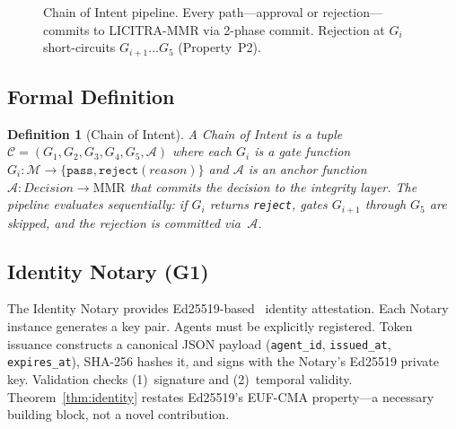 \documentclass[11pt,a4paper]{article}
\newtheorem{definition}[theorem]{Definition}
\begin{document}
\begin{figure}[ht]
\caption{Chain of Intent pipeline. Every path---approval or rejection---commits to
LICITRA-MMR via 2-phase commit. Rejection at $G_i$ short-circuits $G_{i+1}\ldots G_5$
(Property~P2).}
\label{fig:pipeline}
\end{figure}

\subsection{Formal Definition}

\begin{definition}[Chain of Intent]\label{def:chain}
A Chain of Intent is a tuple $\mathcal{C} = (G_1, G_2, G_3, G_4, G_5, \mathcal{A})$ where each
$G_i$ is a gate function $G_i: \mathcal{M} \to \{\texttt{pass}, \texttt{reject}(reason)\}$ and
$\mathcal{A}$ is an anchor function $\mathcal{A}: Decision \to \mathrm{MMR}$ that commits the
decision to the integrity layer. The pipeline evaluates sequentially: if $G_i$ returns
\texttt{reject}, gates $G_{i+1}$ through $G_5$ are skipped, and the rejection is committed
via~$\mathcal{A}$.
\end{definition}

\subsection{Identity Notary (G1)}

The Identity Notary provides Ed25519-based~\cite{ed25519} identity attestation. Each Notary
instance generates a key pair. Agents must be explicitly registered. Token issuance constructs a
canonical JSON payload (\texttt{agent\_id}, \texttt{issued\_at}, \texttt{expires\_at}), SHA-256
hashes it, and signs with the Notary's Ed25519 private key. Validation checks (1)~signature
and (2)~temporal validity. Theorem~\ref{thm:identity} restates Ed25519's EUF-CMA
property---a necessary building block, not a novel contribution.
\end{document}
